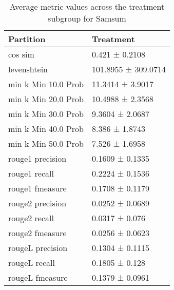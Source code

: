 \begin{table}
\caption{Average metric values across the treatment subgroup for Samsum}
\label{tab:}
\begin{tabular}{ll}
\toprule
Partition & Treatment \\
\midrule
cos sim & 0.421 ± 0.2108 \\
levenshtein & 101.8955 ± 309.0714 \\
min k Min 10.0 Prob & 11.3414 ± 3.9017 \\
min k Min 20.0 Prob & 10.4988 ± 2.3568 \\
min k Min 30.0 Prob & 9.3604 ± 2.0687 \\
min k Min 40.0 Prob & 8.386 ± 1.8743 \\
min k Min 50.0 Prob & 7.526 ± 1.6958 \\
rouge1 precision & 0.1609 ± 0.1335 \\
rouge1 recall & 0.2224 ± 0.1536 \\
rouge1 fmeasure & 0.1708 ± 0.1179 \\
rouge2 precision & 0.0252 ± 0.0689 \\
rouge2 recall & 0.0317 ± 0.076 \\
rouge2 fmeasure & 0.0256 ± 0.0623 \\
rougeL precision & 0.1304 ± 0.1115 \\
rougeL recall & 0.1805 ± 0.128 \\
rougeL fmeasure & 0.1379 ± 0.0961 \\
\bottomrule
\end{tabular}
\end{table}
